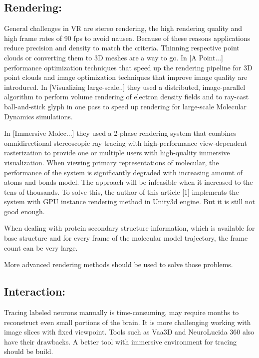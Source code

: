\documentclass[10pt,twocolumn,letterpaper]{article}
\begin{document}
\subsection{Rendering:}
General challenges in VR are stereo rendering, the high rendering quality and high frame rates of 90 fps to avoid nausea. Because of these reasons applications reduce precision and density to match the criteria. Thinning respective point clouds or converting them to 3D meshes are a way to go. In [A Point...] performance optimization techniques that speed up the rendering pipeline for 3D point clouds and image optimization techniques that improve image quality are introduced. In [Visualizing large-scale..] they used a distributed, image-parallel algorithm to perform volume rendering of electron density fields and to ray-cast ball-and-stick glyph in one pass to speed up rendering for large-scale Molecular Dynamics simulations.

\setlength{\parindent}{1pc}
 In [Immersive Molec...] they used a 2-phase rendering system that combines omnidirectional stereoscopic ray tracing with high-performance view-dependent rasterization to provide one or multiple users with high-quality immersive visualization. When viewing primary representations of molecular, the performance of the system is significantly degraded with increasing amount of atoms and bonds model. The approach will be infeasible when it increased to the tens of thousands. To solve this, the author of this article [1] implements the system with GPU instance rendering method in Unity3d engine. But it is still not good enough. 

\setlength{\parindent}{1pc}
When dealing with protein secondary structure information, which is available for base structure and for every frame of the molecular model trajectory, the frame count can be very large.

\setlength{\parindent}{1pc}
More advanced rendering methods should be used to solve those problems.


\subsection{Interaction:}Tracing labeled neurons manually is time-consuming, may require months to reconstruct even small portions of the brain. It is more challenging working with image slices with fixed viewpoint. Tools such as Vaa3D and NeuroLucida 360 also have their drawbacks. A better tool with immersive environment for tracing should be build.
\end{document}

